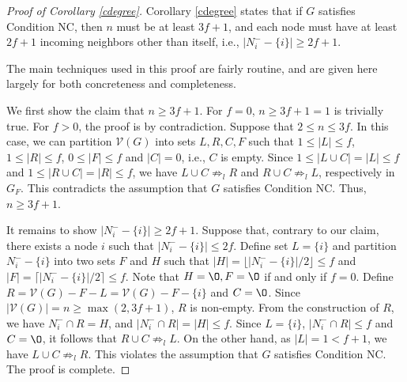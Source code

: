 \documentclass[letterpaper, 11pt]{article}
\newcommand{\calV}{{\mathcal{V}}}
\begin{document}
\begin{proof}[Proof of Corollary \ref{cdegree}]
Corollary \ref{cdegree} states that if $G$ satisfies Condition NC, then
 $n$ must be at least $3f+1$, and each node must have at least $2f+1$ incoming neighbors other than itself, i.e., $|N_i^{-}-\{i\}|\ge 2f+1$.


The main
techniques used in this proof are fairly routine, and are given here
largely for both concreteness and completeness.

We first show the claim that $n\ge 3f+1$.
For $f=0$, $n\ge 3f+1=1$ is trivially true. For $f>0$, the proof is by contradiction. Suppose that $2\le n\le 3f$. In this case, we can partition $\calV(G)$ into sets $L, R, C, F$ such that $1\le |L|\le f$, $1\le |R|\le f$, $0\le |F|\le f$ and $|C|=0$, i.e., $C$ is empty. Since $1\le |L\cup C|=|L|\le f$ and $1\le |R\cup C|=|R|\le f$, we have $L\cup C\not\Rightarrow_l R$ and $R\cup C\not\Rightarrow_l L$, respectively in $G_F$. This contradicts the assumption that $G$ satisfies Condition NC. Thus, $n\ge 3f+1$.

It remains to show $|N_i^{-}-\{i\}|\ge 2f+1$.
Suppose that, contrary to our claim, there exists a node $i$ such that $|N_i^{-}-\{i\}|\le 2f$.
Define set $L=\{i\}$ and partition $N_i^{-}-\{i\}$ into two sets $F$ and $H$
such that $|H|=\lfloor |N_i^{-}-\{i\}|/2\rfloor\leq f$
and $|F|=\lceil |N_i^{-}-\{i\}|/2\rceil\leq f$. Note that $H=\O, F=\O$ if and only if $f=0$.
Define $R=\calV(G)-F-L=\calV(G)-F-\{i\}$ and $C=\O$. Since $|\calV(G)| = n \geq \max(2,3f+1)$, $R$ is non-empty. From the construction of $R$, we have $N_i^-\cap R=H$, and $|N_i^-\cap R|=|H|\leq f$.
Since $L=\{i\}$, $|N_i^-\cap R|\leq f$ and $C=\O$, it follows that $R\cup C\not\Rightarrow_l L$.
On the other hand, as $|L|=1<f+1$, we have $L\cup C\not\Rightarrow_l R$. This violates the assumption that $G$ satisfies Condition NC. The proof is complete.
\end{proof}
\end{document}
